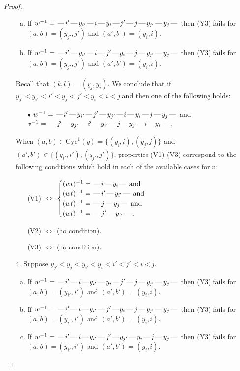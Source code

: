 \documentclass[10pt]{article}
\theoremstyle{definition}
\theoremstyle{definition}
\def\dash{\text{\hspace{0.5mm}---\hspace{0.5mm}}}
\def\Cyc{\mathrm{Cyc}}
\begin{document}
\begin{proof}
\begin{enumerate}
\begin{enumerate}[(a)]
\item If $w^{-1} = \dash i'\dash y_{i'}\dash i\dash y_i\dash j'\dash j\dash y_{j'}\dash y_j\dash $ then (Y3) fails for $(a,b)=(y_{j'},j')$ and $(a',b')=(y_i,i)$.
\item If $w^{-1} = \dash i'\dash y_{i'}\dash i\dash j'\dash y_i\dash j\dash y_{j'}\dash y_j\dash $ then (Y3) fails for $(a,b)=(y_{j'},j')$ and $(a',b')=(y_i,i)$.
\end{enumerate}
Recall that $(k,l) = (y_j,y_i)$.
We conclude that if $y_{j'} < y_{i'} < i' < y_j < j' < y_i < i < j$ and then one of the following holds:
\begin{enumerate}
\item[$\bullet$] $w^{-1} = \dash i'\dash y_{i'}\dash j'\dash y_{j'}\dash i\dash y_i\dash j\dash y_j\dash $ and $v^{-1} = \dash j'\dash y_{j'}\dash i'\dash y_{i'}\dash j\dash y_j\dash i\dash y_i\dash $.
\end{enumerate}
When $(a,b)\in\Cyc^1(y)=\{(y_i,i),(y_j,j)\}$ and $(a',b')\in\{(y_{i'},i'),(y_{j'},j')\}$,
properties (V1)-(V3) correspond to the following conditions which hold in
each of the available cases for $v$:
\begin{enumerate}
\item[](V1) $\Leftrightarrow$ $\begin{cases}\text{$(wt)^{-1} = \dash i \dash y_i \dash$}\text{ and }\\
\text{$(wt)^{-1} = \dash i' \dash y_{i'} \dash$}\text{ and }\\
\text{$(wt)^{-1} = \dash j \dash y_j \dash$}\text{ and }\\
\text{$(wt)^{-1} = \dash j' \dash y_{j'} \dash$}.\end{cases}$
\item[](V2) $\Leftrightarrow$ (no condition).
\item[](V3) $\Leftrightarrow$ (no condition).
\end{enumerate}
\item[$4$.] Suppose $y_{j'} < y_j < y_{i'} < y_i < i' < j' < i < j$.
\begin{enumerate}[(a)]
\item If $w^{-1} = \dash i'\dash i\dash y_{i'}\dash y_i\dash j'\dash j\dash y_{j'}\dash y_j\dash $ then (Y3) fails for $(a,b)=(y_{i'},i')$ and $(a',b')=(y_i,i)$.
\item If $w^{-1} = \dash i'\dash i\dash y_{i'}\dash j'\dash y_i\dash j\dash y_{j'}\dash y_j\dash $ then (Y3) fails for $(a,b)=(y_{i'},i')$ and $(a',b')=(y_i,i)$.
\item If $w^{-1} = \dash i'\dash i\dash y_{i'}\dash j'\dash y_{j'}\dash y_i\dash j\dash y_j\dash $ then (Y3) fails for $(a,b)=(y_{i'},i')$ and $(a',b')=(y_i,i)$.

\end{enumerate}
\end{enumerate}
\end{proof}
\end{document}
